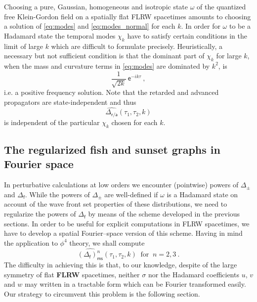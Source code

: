 \documentclass[11pt]{book}
\newcommand{\ms}{\mathsf{ms}}
\newcommand{\asf}{\mathsf{a}}
\newcommand{\esf}{\mathsf{e}}
\newcommand{\fsf}{\mathsf{f}}
\newcommand{\rsf}{\mathsf{r}}
\theoremstyle{break}
\begin{document}
%
Choosing a pure, Gaussian, homogeneous and isotropic state $\omega$ of the quantized free Klein-Gordon field on a spatially flat FLRW spacetimes amounts to choosing a solution of \eqref{eq:modes} and \eqref{eq:modes_normal} for each $k$. In order for $\omega$ to be a Hadamard state the temporal modes $\chi_k$ have to satisfy certain conditions in the limit of large $k$ which are difficult to formulate precisely. Heuristically, a necessary but not sufficient condition is that the dominant part of $\chi_k$ for large $k$, when the mass and curvature terms in \eqref{eq:modes} are dominated by $k^2$, is 
%
\begin{equation*}
\frac{1}{\sqrt{2k}} \ \esf^{-ik\tau} \ , 
\end{equation*}
%
i.e. a positive frequency solution. Note that the retarded and advanced propagators are state-independent and thus 
%
\begin{equation*}
\widehat{\Delta_{\rsf/\asf}}(\tau_1,\tau_2,k) 
\end{equation*}
%
is independent of the particular $\chi_k$ chosen for each $k$.


\subsection{The regularized fish and sunset graphs in Fourier space}
\label{p:SUNSET_FISH_FLWR}


In perturbative calculations at low orders we encounter (pointwise) powers of $\Delta_\pm$ and $\Delta_\fsf$. While the powers of $\Delta_\pm$ are well-defined if $\omega$ is a Hadamard state on account of the wave front set properties of these distributions, we need to regularize the powers of $\Delta_\fsf$ by means of the scheme developed in the previous sections. In order to be useful for explicit computations in FLRW spacetimes, we have to develop a spatial Fourier--space version of this scheme. Having in mind the application to $\phi^4$ theory, we shall compute 
%
\begin{equation*}
\widehat{(\Delta_\fsf)^n_\ms}(\tau_1,\tau_2,k) \ \mbox{ for } \ n = 2 , 3 \ . 
\end{equation*}
%
The difficulty in achieving this is that, to our knowledge, despite of the large symmetry of flat \textbf{FLRW} spacetimes, neither $\sigma$ nor the Hadamard coefficients $u$, $v$ and $w$ may written in a tractable form which can be Fourier transformed easily. Our strategy to circumvent this problem is the following section.
\end{document}
